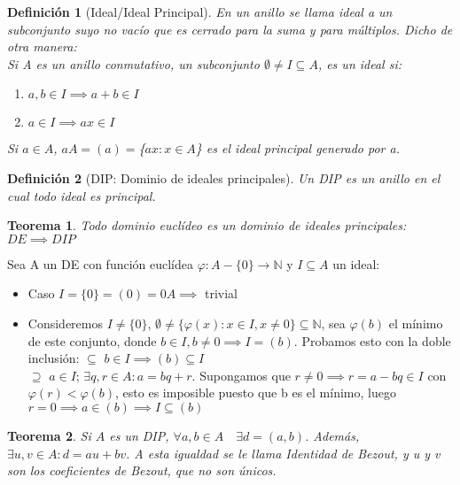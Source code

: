 \documentclass[11pt, a4paper, titlepage]{article}
\makeatletter
\renewenvironment{proof}[1][\proofname] {\vspace{-15pt}\par\pushQED{\qed}\normalfont\topsep6\p@\@plus6\p@\relax\trivlist\item[\hskip\labelsep\it#1\@addpunct{.}]\ignorespaces}{\popQED\endtrivlist\@endpefalse}
\theoremstyle{theorem-style}
\newtheorem*{nth}{Teorema}
\theoremstyle{definition-style}
\newtheorem*{ndef}{Definición}
\theoremstyle{remark-style}
\theoremstyle{example-style}
\newenvironment{nlist}
{\begin{enumerate}
\renewcommand\labelenumi{(\emph{\roman{enumi})}}}
{\end{enumerate}}
\makeatother
\begin{document}
\begin{ndef}[Ideal/Ideal Principal]
	En un anillo se llama ideal a un subconjunto suyo no vacío que es cerrado para la suma y para múltiplos. Dicho de otra manera: \\
	Si A es un anillo conmutativo, un subconjunto $\emptyset \not= I\subseteq A$, es un ideal si:
	\begin{nlist}
		\item $a,b\in I \implies a+b\in I$
		\item $a\in I \implies ax \in I$
	\end{nlist}
	Si $a\in A$, $aA=(a)=$\{$ax: x\in A$\} es el ideal principal generado por a.
\end{ndef}


\begin{ndef}[DIP: Dominio de ideales principales]
	Un DIP es un anillo en el cual todo ideal es principal.
\end{ndef}
\begin{nth}
	Todo dominio euclídeo es un dominio de ideales principales: $DE \implies DIP$
\end{nth}
\begin{proof}
	Sea A un DE con función euclídea $\varphi: A-\{ 0 \} \longrightarrow \mathbb{N}$ y $I\subseteq A$ un ideal:
	\begin{itemize}
		\item Caso $I=\{ 0 \} = (0)= 0A \implies $ trivial
		\item Consideremos $I\neq \{ 0\}$, $\emptyset \neq \{ \varphi (x): x\in I, x\neq 0\} \subseteq \mathbb{N}$, sea $\varphi (b)$ el mínimo de este conjunto, donde $b\in I, b\neq 0 \implies I=(b)$. Probamos esto con la doble inclusión:
		$\boxed{\subseteq}$ $b\in I \implies (b)\subseteq I$ \\
		$\boxed{\supseteq}$ $a\in I$; $\exists q,r\in A: a=bq+r$. Supongamos que $r\neq 0 \implies r=a-bq\in I$ con $\varphi (r) < \varphi (b)$, esto es imposible puesto que b es el mínimo, luego $r=0 \implies a\in (b) \implies I\subseteq (b)$
	\end{itemize}
\end{proof}


\begin{nth}
	Si $A$ es un DIP, $\forall a,b \in A \quad \exists d = (a,b)$. Además, $\exists u,v \in A : d = au+bv$. A esta igualdad se le llama Identidad de Bezout, y u y v son los coeficientes de Bezout, que no son únicos.
	
\end{nth}
\end{document}
